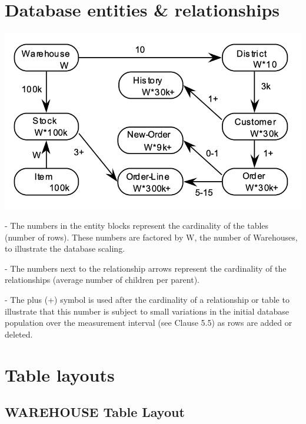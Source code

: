 \section{Database entities \& relationships}

\includegraphics{img/relationships.png}

- The numbers in the entity blocks represent the cardinality of the tables (number of rows). These numbers are factored by W, the number of Warehouses, to illustrate the database scaling.

- The numbers next to the relationship arrows represent the cardinality of the relationships (average number of children per parent).

- The plus (+) symbol is used after the cardinality of a relationship or table to illustrate that this number is subject to small variations in the initial database population over the measurement interval (see Clause 5.5) as rows are added or deleted.

\section{Table layouts}

\subsection{WAREHOUSE Table Layout}

